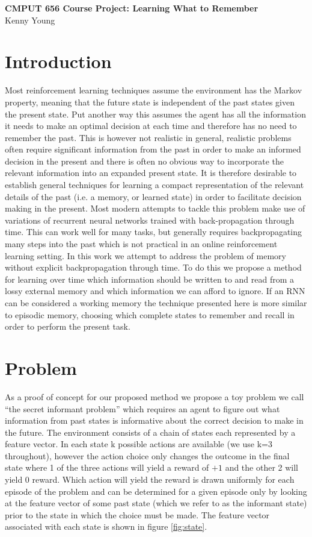\documentclass{article}
\begin{document}
\begin{center}
{\Large \textbf{CMPUT 656 Course Project: Learning What to Remember}}\\
{Kenny Young}
\end{center}
\section*{Introduction}
Most reinforcement learning techniques assume the environment has the Markov property, meaning that the future state is independent of the past states given the present state. Put another way this assumes the agent has all the information it needs to make an optimal decision at each time and therefore has no need to remember the past. This is however not realistic in general, realistic problems often require significant information from the past in order to make an informed decision in the present and there is often no obvious way to incorporate the relevant information into an expanded present state. It is therefore desirable to establish general techniques for learning a compact representation of the relevant details of the past (i.e. a memory, or learned state) in order to facilitate decision making in the present.
Most modern attempts to tackle this problem make use of variations of recurrent neural networks trained with back-propagation through time. This can work well for many tasks, but generally requires backpropagating many steps into the past which is not practical in an online reinforcement learning setting. In this work we attempt to address the problem of memory without explicit backpropagation through time. To do this we propose a method for learning over time which information should be written to and read from a lossy external memory and which information we can afford to ignore. If an RNN can be considered a working memory the technique presented here is more similar to episodic memory, choosing which complete states to remember and recall in order to perform the present task.

\section*{Problem}
As a proof of concept for our proposed method we propose a toy problem we call ``the secret informant problem'' which requires an agent to figure out what information from past states is informative about the correct decision to make in the future. The environment consists of a chain of states each represented by a feature vector. In each state k possible actions are available (we use k=3 throughout), however the action choice only changes the outcome in the final state where 1 of the three actions will yield a reward of $+1$ and the other 2 will yield $0$ reward. Which action will yield the reward is drawn uniformly for each episode of the problem and can be determined for a given episode only by looking at the feature vector of some past state (which we refer to as the informant state) prior to the state in which the choice must be made. The feature vector associated with each state is shown in figure \ref{fig:state}.
\end{document}
